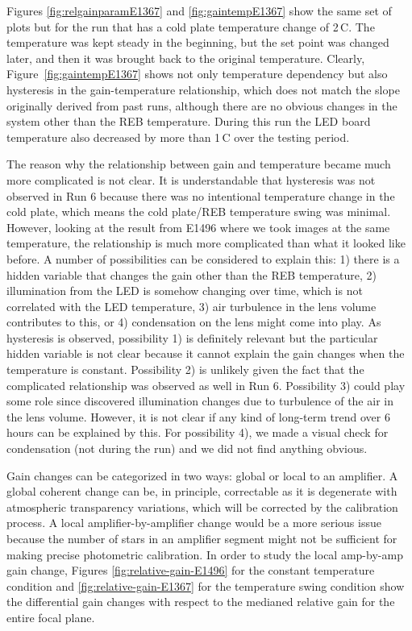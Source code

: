 Figures \ref{fig:relgainparamE1367} and \ref{fig:gaintempE1367} show the same set of plots but for the run that has a cold plate temperature change of 2\,C.
The temperature was kept steady in the beginning, but the set point was changed later, and then it was brought back to the original temperature.
Clearly, Figure~\ref{fig:gaintempE1367} shows not only temperature dependency but also hysteresis in the gain-temperature relationship, which does not match the slope originally derived from past runs, although there are no obvious changes in the system other than the REB temperature.
During this run the LED board temperature also decreased by more than 1\,C over the testing period.


The reason why the relationship between gain and temperature became much more complicated is not clear. It is understandable that hysteresis was not observed in Run 6 because there was no intentional temperature change in the cold plate, which means the cold plate/REB temperature swing was minimal. However, looking at the result from E1496 where we took images at the same temperature, the relationship is much more complicated than what it looked like before. A number of possibilities can be considered to explain this: 1) there is a hidden variable that changes the gain other than the REB temperature, 2) illumination from the LED is somehow changing over time, which is not correlated with the LED temperature, 3) air turbulence in the lens volume contributes to this, or 4) condensation on the lens might come into play. As hysteresis is observed, possibility 1) is definitely relevant but the particular hidden variable is not clear because it cannot explain the gain changes when the temperature is constant. Possibility 2) is unlikely given the fact that the complicated relationship was observed as well in Run 6. Possibility 3) could play some role since \citet{2024arXiv241113386B} discovered illumination changes due to turbulence of the air in the lens volume. However, it is not clear if any kind of long-term trend over 6 hours can be explained by this. For possibility 4), we made a visual check for condensation (not during the run) and we did not find anything obvious.

Gain changes can be categorized in two ways: global or local to an amplifier.  A global coherent change can be, in principle, correctable as it is degenerate with atmospheric transparency variations, which will be corrected by the calibration process. A local amplifier-by-amplifier change would be a more serious issue because the number of stars in an amplifier segment might not be sufficient for making precise photometric calibration. In order to study the local amp-by-amp gain change, Figures \ref{fig:relative-gain-E1496} for the constant temperature condition and \ref{fig:relative-gain-E1367} for the temperature swing condition show the differential gain changes with respect to the medianed relative gain for the entire focal plane. %

